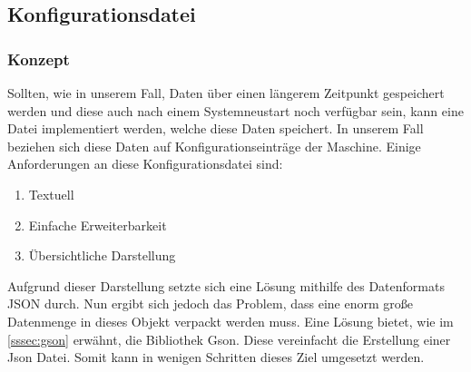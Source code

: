 \subsection{Konfigurationsdatei}\label{subsec:konfiguration}
\subsubsection{Konzept}
Sollten, wie in unserem Fall, Daten über einen längerem Zeitpunkt gespeichert werden und diese auch nach einem Systemneustart noch verfügbar sein, kann eine Datei implementiert werden, welche diese Daten speichert.
In unserem Fall beziehen sich diese Daten auf Konfigurationseinträge der Maschine.
Einige Anforderungen an diese Konfigurationsdatei sind:
\begin{enumerate}
\item Textuell
\item Einfache Erweiterbarkeit
\item Übersichtliche Darstellung
\end{enumerate}
Aufgrund dieser Darstellung setzte sich eine Lösung mithilfe des Datenformats JSON durch.
Nun ergibt sich jedoch das Problem, dass eine enorm große Datenmenge in dieses Objekt verpackt werden muss.
Eine Lösung bietet, wie im \autoref{sssec:gson} erwähnt, die Bibliothek Gson.
Diese vereinfacht die Erstellung einer Json Datei.
Somit kann in wenigen Schritten dieses Ziel umgesetzt werden.
